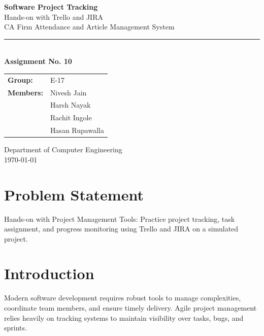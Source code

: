 \documentclass[12pt,a4paper]{article}
\begin{document}
\begin{titlepage}
\centering
\vspace*{2cm}
{\Huge\bfseries\color{headblue} Software Project Tracking\\[12pt]}
{\LARGE Hands-on with Trello and JIRA\\[8pt]}
{\large CA Firm Attendance and Article Management System\\[20pt]}
\rule{0.6\textwidth}{1pt}\\[20pt]

{\large\textbf{Assignment No. 10}}\\[30pt]

\begin{tabular}{ll}
\textbf{Group:} & E-17 \\[4pt]
\textbf{Members:} & Nivesh Jain \\
 & Harsh Nayak \\
 & Rachit Ingole \\
 & Hasan Rupawalla \\
\end{tabular}

\vfill
{\small Department of Computer Engineering\\
\today}
\end{titlepage}

\section{Problem Statement}
Hands-on with Project Management Tools: Practice project tracking, task assignment, and progress monitoring using Trello and JIRA on a simulated project.

\section{Introduction}
Modern software development requires robust tools to manage complexities, coordinate team members, and ensure timely delivery. Agile project management relies heavily on tracking systems to maintain visibility over tasks, bugs, and sprints.
\end{document}
